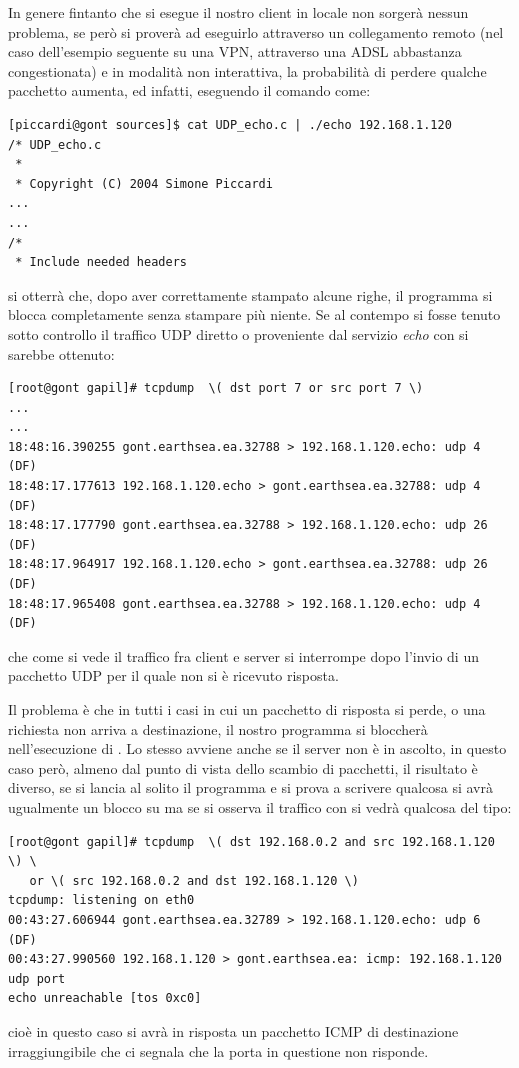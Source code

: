 In genere fintanto che si esegue il nostro client in locale non sorgerà nessun
problema, se però si proverà ad eseguirlo attraverso un collegamento remoto
(nel caso dell'esempio seguente su una VPN, attraverso una ADSL abbastanza
congestionata) e in modalità non interattiva, la probabilità di perdere
qualche pacchetto aumenta, ed infatti, eseguendo il comando come:
\begin{verbatim}
[piccardi@gont sources]$ cat UDP_echo.c | ./echo 192.168.1.120
/* UDP_echo.c
 *
 * Copyright (C) 2004 Simone Piccardi
...
...
/*
 * Include needed headers

\end{verbatim}%
si otterrà che, dopo aver correttamente stampato alcune righe, il programma si
blocca completamente senza stampare più niente. Se al contempo si fosse tenuto
sotto controllo il traffico UDP diretto o proveniente dal servizio
\textit{echo} con  si sarebbe ottenuto:
\begin{verbatim}
[root@gont gapil]# tcpdump  \( dst port 7 or src port 7 \)
...
...
18:48:16.390255 gont.earthsea.ea.32788 > 192.168.1.120.echo: udp 4 (DF)
18:48:17.177613 192.168.1.120.echo > gont.earthsea.ea.32788: udp 4 (DF)
18:48:17.177790 gont.earthsea.ea.32788 > 192.168.1.120.echo: udp 26 (DF)
18:48:17.964917 192.168.1.120.echo > gont.earthsea.ea.32788: udp 26 (DF)
18:48:17.965408 gont.earthsea.ea.32788 > 192.168.1.120.echo: udp 4 (DF)
\end{verbatim}
che come si vede il traffico fra client e server si interrompe dopo l'invio di
un pacchetto UDP per il quale non si è ricevuto risposta.

Il problema è che in tutti i casi in cui un pacchetto di risposta si perde, o
una richiesta non arriva a destinazione, il nostro programma si bloccherà
nell'esecuzione di . Lo stesso avviene anche se il server non è
in ascolto, in questo caso però, almeno dal punto di vista dello scambio di
pacchetti, il risultato è diverso, se si lancia al solito il programma e si
prova a scrivere qualcosa si avrà ugualmente un blocco su  ma
se si osserva il traffico con  si vedrà qualcosa del tipo:
\begin{verbatim}
[root@gont gapil]# tcpdump  \( dst 192.168.0.2 and src 192.168.1.120 \) \
   or \( src 192.168.0.2 and dst 192.168.1.120 \)
tcpdump: listening on eth0
00:43:27.606944 gont.earthsea.ea.32789 > 192.168.1.120.echo: udp 6 (DF)
00:43:27.990560 192.168.1.120 > gont.earthsea.ea: icmp: 192.168.1.120 udp port 
echo unreachable [tos 0xc0]
\end{verbatim}
cioè in questo caso si avrà in risposta un pacchetto ICMP di destinazione
irraggiungibile che ci segnala che la porta in questione non risponde. 

